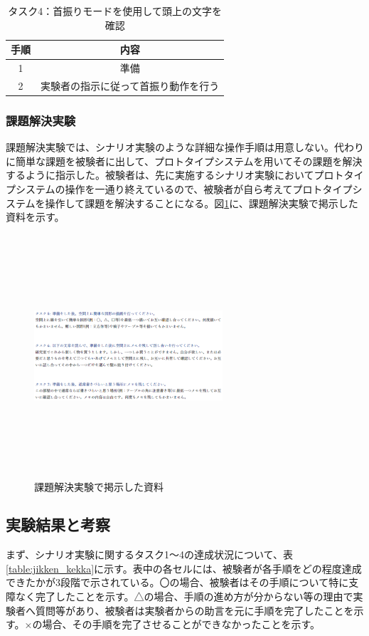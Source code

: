 \documentclass[11pt,a4j, titlepage]{jarticle} %
\begin{document}
\begin{table}[H]
\caption{タスク4：首振りモードを使用して頭上の文字を確認}
\label{table:task4}
\begin{center}
\begin{tabular}{|c|c|}
\hline
手順 & 内容  \\
\hline\hline
1 & 準備  \\
\hline
2 & 実験者の指示に従って首振り動作を行う  \\
\hline
\end{tabular}
\end{center}
\end{table}

\subsubsection{課題解決実験}
課題解決実験では、シナリオ実験のような詳細な操作手順は用意しない。代わりに簡単な課題を被験者に出して、プロトタイプシステムを用いてその課題を解決するように指示した。被験者は、先に実施するシナリオ実験においてプロトタイプシステムの操作を一通り終えているので、被験者が自ら考えてプロトタイプシステムを操作して課題を解決することになる。図\ref{fig:task5}に、課題解決実験で掲示した資料を示す。

\begin{figure}[H]
  \begin{center}
    \includegraphics[clip,height=9.0cm,width=7.0cm]{./task5.eps}
    \caption{課題解決実験で掲示した資料}
    \label{fig:task5}
  \end{center}
\end{figure}

\subsection{実験結果と考察}
まず、シナリオ実験に関するタスク1～4の達成状況について、表\ref{table:jikken_kekka}に示す。表中の各セルには、被験者が各手順をどの程度達成できたかが3段階で示されている。〇の場合、被験者はその手順について特に支障なく完了したことを示す。△の場合、手順の進め方が分からない等の理由で実験者へ質問等があり、被験者は実験者からの助言を元に手順を完了したことを示す。×の場合、その手順を完了させることができなかったことを示す。
\end{document}
